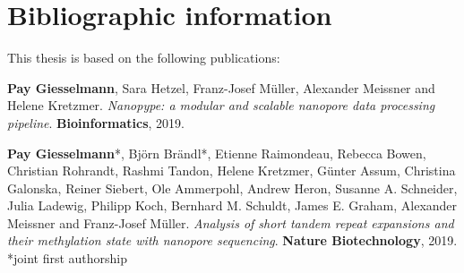 \chapter*{Bibliographic information}
\label{sec:bib}
\vspace*{-10mm}


This thesis is based on the following publications:

\textbf{Pay Giesselmann}, Sara Hetzel, Franz-Josef Müller, Alexander Meissner and Helene Kretzmer. \textit{Nanopype: a modular and scalable nanopore data processing pipeline}. \textbf{Bioinformatics}, 2019.


\textbf{Pay Giesselmann}*, Björn Brändl*, Etienne Raimondeau, Rebecca Bowen, Christian Rohrandt, Rashmi Tandon, Helene Kretzmer, Günter Assum, Christina Galonska, Reiner Siebert, Ole Ammerpohl, Andrew Heron, Susanne A. Schneider, Julia Ladewig, Philipp Koch, Bernhard M. Schuldt, James E. Graham, Alexander Meissner and Franz-Josef Müller. \textit{Analysis of short tandem repeat expansions and their methylation state with nanopore sequencing}. \textbf{Nature Biotechnology}, 2019. *joint first authorship






